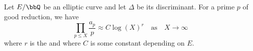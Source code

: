 \begin{conjecture} \label{conjecture:original_bsd_conjecture}
    Let $E/\bbQ$ be an elliptic curve and let $\Delta$ be its discriminant. For a prime $p$ of good reduction, we have 
    $$\prod_{p \leq X} \frac{a_p}{p} \approx C \log(X)^r \quad \text{as} \quad X \to \infty$$
    where $r$ is the  and where $C$ is some constant depending on $E$.
\end{conjecture}
